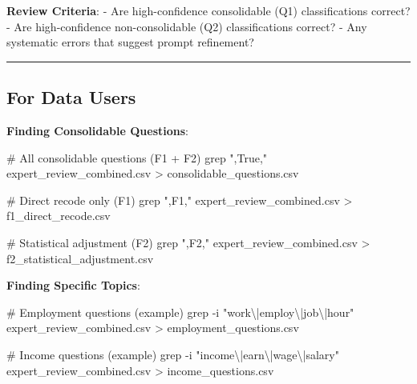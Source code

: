 \documentclass[
  letterpaper,
]{report}
\newenvironment{Shaded}{\begin{snugshade}}{\end{snugshade}}
\newcommand{\AttributeTok}[1]{\textcolor[rgb]{0.40,0.45,0.13}{#1}}
\newcommand{\CommentTok}[1]{\textcolor[rgb]{0.37,0.37,0.37}{#1}}
\newcommand{\FunctionTok}[1]{\textcolor[rgb]{0.28,0.35,0.67}{#1}}
\newcommand{\NormalTok}[1]{\textcolor[rgb]{0.00,0.23,0.31}{#1}}
\newcommand{\OperatorTok}[1]{\textcolor[rgb]{0.37,0.37,0.37}{#1}}
\newcommand{\StringTok}[1]{\textcolor[rgb]{0.13,0.47,0.30}{#1}}
\begin{document}
\textbf{Review Criteria}: - Are high-confidence consolidable (Q1)
classifications correct? - Are high-confidence non-consolidable (Q2)
classifications correct? - Any systematic errors that suggest prompt
refinement?

\begin{center}\rule{0.5\linewidth}{0.5pt}\end{center}

\subsection{For Data Users}\label{for-data-users-2}

\textbf{Finding Consolidable Questions}:

\begin{Shaded}
\begin{Highlighting}[]
\CommentTok{\# All consolidable questions (F1 + F2)}
\FunctionTok{grep} \StringTok{",True,"}\NormalTok{ expert\_review\_combined.csv }\OperatorTok{\textgreater{}}\NormalTok{ consolidable\_questions.csv}

\CommentTok{\# Direct recode only (F1)}
\FunctionTok{grep} \StringTok{",F1,"}\NormalTok{ expert\_review\_combined.csv }\OperatorTok{\textgreater{}}\NormalTok{ f1\_direct\_recode.csv}

\CommentTok{\# Statistical adjustment (F2)}
\FunctionTok{grep} \StringTok{",F2,"}\NormalTok{ expert\_review\_combined.csv }\OperatorTok{\textgreater{}}\NormalTok{ f2\_statistical\_adjustment.csv}
\end{Highlighting}
\end{Shaded}

\textbf{Finding Specific Topics}:

\begin{Shaded}
\begin{Highlighting}[]
\CommentTok{\# Employment questions (example)}
\FunctionTok{grep} \AttributeTok{{-}i} \StringTok{"work\textbackslash{}|employ\textbackslash{}|job\textbackslash{}|hour"}\NormalTok{ expert\_review\_combined.csv }\OperatorTok{\textgreater{}}\NormalTok{ employment\_questions.csv}

\CommentTok{\# Income questions (example)}
\FunctionTok{grep} \AttributeTok{{-}i} \StringTok{"income\textbackslash{}|earn\textbackslash{}|wage\textbackslash{}|salary"}\NormalTok{ expert\_review\_combined.csv }\OperatorTok{\textgreater{}}\NormalTok{ income\_questions.csv}
\end{Highlighting}
\end{Shaded}
\end{document}

